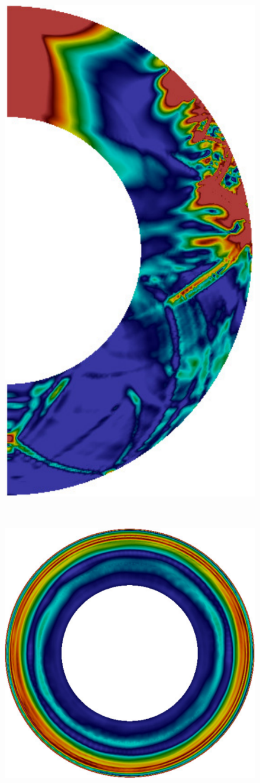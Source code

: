 \documentclass[extra]{gji}
\begin{document}
\begin{figure}
\begin{minipage}{0.6\textwidth}
\begin{minipage}{.585\textwidth}
      \label{fig:1deq}  
    \end{minipage}
    \begin{minipage}{.39\textwidth}
      \centering
      \includegraphics[height=1.275\textwidth]{fig/snapshot/1d-slice.pdf}
      \label{fig:1dsl}    
    \end{minipage}\\
    \begin{minipage}{.585\textwidth}
      \centering
      \vspace{1em}
      \includegraphics[height=.85\textwidth]{fig/snapshot/3d-phi.pdf}

\end{minipage}
\end{minipage}
\end{figure}
\end{document}
